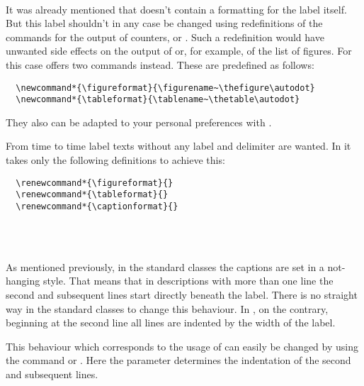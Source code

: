 \begin{Declaration}
  \\
\end{Declaration}%
%
%
It was already mentioned that  doesn't contain a
formatting for the label itself. But this label shouldn't in any case
be changed using redefinitions of the commands for the output of
counters,  or . Such a redefinition
would have unwanted side effects on the output of  or, for
example, of the list of figures. For this case {\KOMAScript} offers
two  commands instead. These are predefined as
follows:
\begin{lstlisting}
  \newcommand*{\figureformat}{\figurename~\thefigure\autodot}
  \newcommand*{\tableformat}{\tablename~\thetable\autodot}
\end{lstlisting}
They also can be adapted to your personal preferences with
.
\begin{Example}
  From time to time label texts without any label and delimiter are
  wanted. In {\KOMAScript} it takes only the following definitions to
  achieve this:
\begin{lstlisting}
  \renewcommand*{\figureformat}{}
  \renewcommand*{\tableformat}{}
  \renewcommand*{\captionformat}{}
\end{lstlisting}
\end{Example}
%
%
%

\begin{Declaration}
  \\
  \\
\end{Declaration}%
%
%
%
As mentioned previously, in the standard classes the captions are set
in a not-hanging style. That means that in descriptions with more than
one line the second and subsequent lines start directly beneath the
label.  There is no straight way in the standard classes to change
this behaviour. In {\KOMAScript}, on the contrary, beginning at the
second line all lines are indented by the width of the label.

This behaviour which corresponds to the usage of 
can easily be changed by using the command  or
. Here the parameter  determines
the indentation of the second and subsequent lines.

